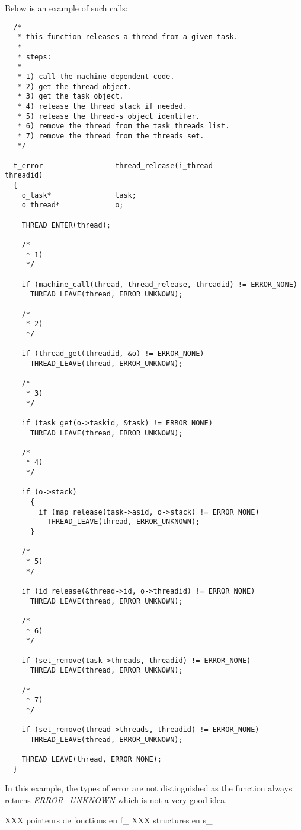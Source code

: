 Below is an example of such calls:

\begin{verbatim}
  /*
   * this function releases a thread from a given task.
   *
   * steps:
   *
   * 1) call the machine-dependent code.
   * 2) get the thread object.
   * 3) get the task object.
   * 4) release the thread stack if needed.
   * 5) release the thread-s object identifer.
   * 6) remove the thread from the task threads list.
   * 7) remove the thread from the threads set.
   */

  t_error                 thread_release(i_thread                 threadid)
  {
    o_task*               task;
    o_thread*             o;

    THREAD_ENTER(thread);

    /*
     * 1)
     */

    if (machine_call(thread, thread_release, threadid) != ERROR_NONE)
      THREAD_LEAVE(thread, ERROR_UNKNOWN);

    /*
     * 2)
     */

    if (thread_get(threadid, &o) != ERROR_NONE)
      THREAD_LEAVE(thread, ERROR_UNKNOWN);

    /*
     * 3)
     */

    if (task_get(o->taskid, &task) != ERROR_NONE)
      THREAD_LEAVE(thread, ERROR_UNKNOWN);

    /*
     * 4)
     */

    if (o->stack)
      {
        if (map_release(task->asid, o->stack) != ERROR_NONE)
          THREAD_LEAVE(thread, ERROR_UNKNOWN);
      }

    /*
     * 5)
     */

    if (id_release(&thread->id, o->threadid) != ERROR_NONE)
      THREAD_LEAVE(thread, ERROR_UNKNOWN);

    /*
     * 6)
     */

    if (set_remove(task->threads, threadid) != ERROR_NONE)
      THREAD_LEAVE(thread, ERROR_UNKNOWN);

    /*
     * 7)
     */

    if (set_remove(thread->threads, threadid) != ERROR_NONE)
      THREAD_LEAVE(thread, ERROR_UNKNOWN);

    THREAD_LEAVE(thread, ERROR_NONE);
  }
\end{verbatim}

In this example, the types of error are not distinguished as the function
always returns \textit{ERROR\_UNKNOWN} which is not a very good idea.

XXX pointeurs de fonctions en f\_
XXX structures en s\_
